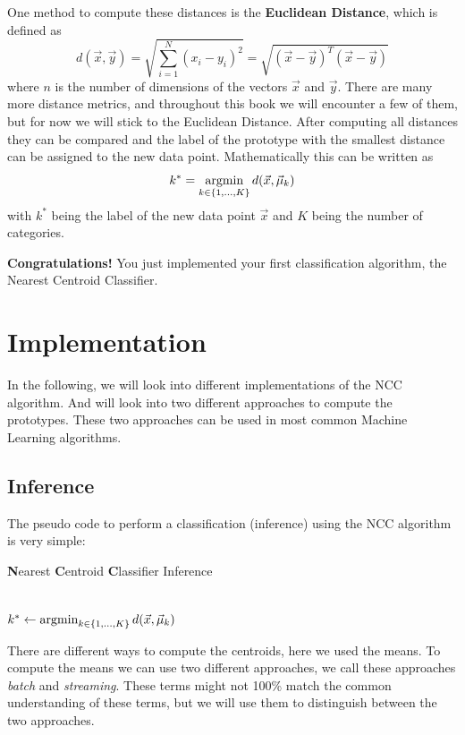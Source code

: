 One method to compute these distances is the \textbf{Euclidean Distance}, which is defined as
\begin{equation}
  d(\vec{x}, \vec{y}) = \sqrt{\sum_{i=1}^{N} (x_i - y_i)^2} = \sqrt{(\vec{x} - \vec{y})^T (\vec{x} - \vec{y})}
\end{equation}
where $n$ is the number of dimensions of the vectors $\vec{x}$ and $\vec{y}$.
There are many more distance metrics, and throughout this book we will encounter a few of them, but for now we will stick to the Euclidean Distance.
After computing all distances they can be compared and the label of the prototype with the smallest distance can be assigned to the new data point.
Mathematically this can be written as
\begin{equation}
  k^* = \operatorname*{argmin}_{k\in\{1,\dots,K\}} d(\vec{x}, \vec{\mu}_k)
  \label{eq:nearest_centroid_inference}
\end{equation}
with $k^*$ being the label of the new data point $\vec{x}$ and $K$ being the number of categories.

\textbf{Congratulations!} You just implemented your first classification algorithm, the Nearest Centroid Classifier.
\section{Implementation}
In the following, we will look into different implementations of the NCC algorithm. And will look into two different approaches to compute the prototypes.
These two approaches can be used in most common Machine Learning algorithms.

\subsection{Inference}
The pseudo code to perform a classification (inference) using the NCC algorithm is very simple:
\begin{algorithm}
\LinesNumbered
\caption{\textbf{N}earest \textbf{C}entroid \textbf{C}lassifier Inference}\label{alg:ncc}
\\
$k^* \gets \operatorname*{argmin}_{k\in\{1,\dots,K\}} d(\vec{x}, \vec{\mu}_k)$\;
\end{algorithm}

There are different ways to compute the centroids, here we used the means.
To compute the means we can use two different approaches, we call these approaches \textit{batch} and \textit{streaming}.
These terms might not 100\% match the common understanding of these terms, but we will use them to distinguish between the two approaches.


